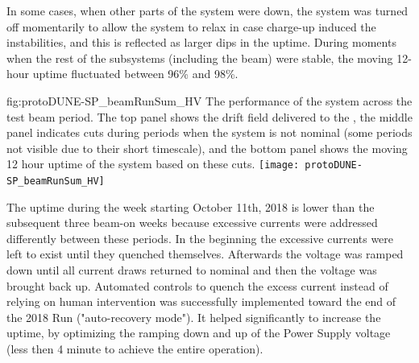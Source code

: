 In some cases, when other parts of the system were down, the  system was turned off momentarily to allow the system to relax in case 
charge-up induced the %
instabilities, and this is reflected as larger dips in the uptime.
During moments when the rest of the subsystems (including the beam) were stable, the moving 12-hour  uptime fluctuated between 96\% and 98\%.

\begin{dunefigure}
{fig:protoDUNE-SP_beamRunSum_HV}
{The performance of the  system across the test beam period. The top panel shows the drift field delivered to the , the middle panel indicates  cuts during periods when the system is not nominal (some periods not visible due to their short timescale), and the bottom panel shows the moving 12 hour uptime of the  system based on these  cuts.
}
\texttt{[image: protoDUNE-SP\_beamRunSum\_HV]}
\end{dunefigure}

The uptime during the week starting October 11th, 2018 is lower than the subsequent three beam-on weeks because excessive currents were addressed differently between these periods.
In the beginning the excessive currents were left to exist until they quenched themselves.
Afterwards the voltage was ramped down until all current draws returned to nominal and then the voltage was brought back up.
Automated controls to quench the excess current instead of relying on human intervention was successfully implemented toward the end of the 2018 Run ("auto-recovery mode"). It helped significantly to increase the uptime, by optimizing the ramping down and up of the Power Supply voltage (less then 4 minute to achieve the entire operation).


